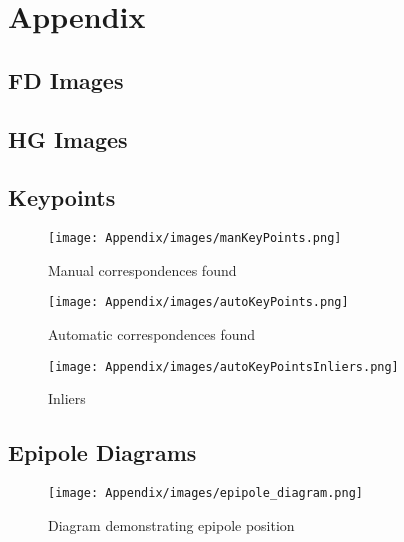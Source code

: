 \section{Appendix}
\subsection{FD Images}
\label{apx:fd}
\subsection{HG Images}
\label{apx:hg}

\subsection{Keypoints}
\label{ap:kp}
\begin{figure}[ht]
    \centering
    \texttt{[image: Appendix/images/manKeyPoints.png]}
    \caption{Manual correspondences found}
    \label{keypoints:manual}
 \end{figure}

\begin{figure}[ht]
    \centering
    \texttt{[image: Appendix/images/autoKeyPoints.png]}
    \caption{Automatic correspondences found}
    \label{keypoints:auto}
\end{figure}

\begin{figure}[ht]
    \centering
    \texttt{[image: Appendix/images/autoKeyPointsInliers.png]}
    \caption{Inliers}
    \label{keypoints:inliers}
\end{figure}

\subsection{Epipole Diagrams}
\label{ap:epipole_diagrams}
    
\begin{figure}[ht]
    \centering
    \texttt{[image: Appendix/images/epipole\_diagram.png]}
    \caption{Diagram demonstrating epipole position}
    \label{fig:epipole_diagram}
\end{figure}